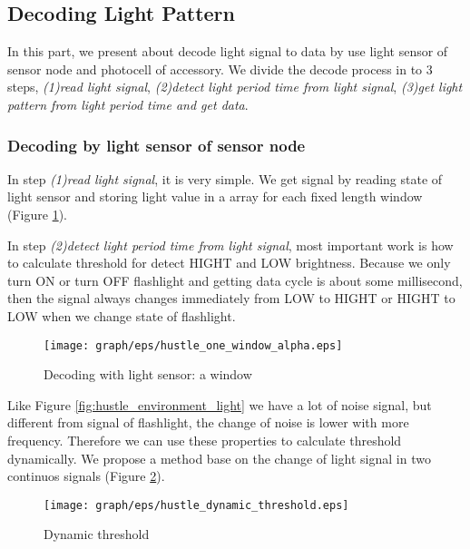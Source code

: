 \subsection{Decoding Light Pattern}

In this part, we present about decode light signal to data by use light sensor of sensor node and photocell of accessory.
We divide the decode process in to 3 steps, \emph{(1)read light signal}, \emph{(2)detect light period time from light signal}, \emph{(3)get light pattern from light period time and get data}.

\subsubsection{Decoding by light sensor of sensor node}

In step \emph{(1)read light signal}, it is very simple. We get signal by reading state of light sensor and storing light value in a array for each fixed length window (Figure \ref{fig:hustle_one_window}).

In step \emph{(2)detect light period time from light signal}, most important work is how to calculate threshold for detect HIGHT and LOW brightness. Because we only turn ON or turn OFF flashlight and getting data cycle is about some millisecond, then the signal always changes immediately from LOW to HIGHT or HIGHT to LOW when we change state of flashlight.

\begin{figure}[tb]
\centering
\texttt{[image: graph/eps/hustle\_one\_window\_alpha.eps]}
\caption{Decoding with light sensor: a window}
\label{fig:hustle_one_window}
\end{figure}

Like Figure \ref{fig:hustle_environment_light} we have a lot of noise signal, but different from signal of flashlight, the change of noise is lower with more frequency. Therefore we can use these properties to calculate threshold dynamically. We propose a method base on the change of light signal in two continuos signals (Figure \ref{fig:hustle_dynamic_threshold}). 

\begin{figure}[htbp]
\centering
\texttt{[image: graph/eps/hustle\_dynamic\_threshold.eps]}
\caption{Dynamic threshold}
\label{fig:hustle_dynamic_threshold}
\end{figure}


